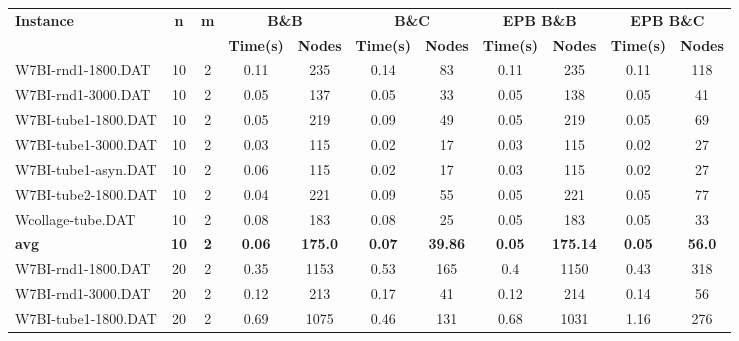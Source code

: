 \begin{table}[!ht]
\centering
\hspace*{-1cm}\begin{tabular}{lcccccccccc}
\toprule
\textbf{Instance} & \textbf{n} & \textbf{m} & \multicolumn{2}{c}{\textbf{B\&B}} & \multicolumn{2}{c}{\textbf{B\&C}}  & \multicolumn{2}{c}{\textbf{EPB B\&B}} & \multicolumn{2}{c}{\textbf{EPB B\&C}} \\

\cmidrule(r){4-5} \cmidrule(r){6-7} \cmidrule(r){8-9} \cmidrule(r){10-11} 
~ & ~ & ~ & \textbf{Time(s)} &\textbf{Nodes} & \textbf{Time(s)} &\textbf{Nodes} & \textbf{Time(s)} &\textbf{Nodes} & \textbf{Time(s)} &\textbf{Nodes}  \\
\midrule

W7BI-rnd1-1800.DAT & 10 & 2 &  \textcolor{blue2}{0.11} & 235 & 0.14 & 83 &  \textcolor{blue2}{0.11} & 235 &  \textcolor{blue2}{0.11} & 118 \\
W7BI-rnd1-3000.DAT & 10 & 2 &  \textcolor{blue2}{0.05} & 137 &  \textcolor{blue2}{0.05} & 33 &  \textcolor{blue2}{0.05} & 138 &  \textcolor{blue2}{0.05} & 41 \\
W7BI-tube1-1800.DAT & 10 & 2 &  \textcolor{blue2}{0.05} & 219 & 0.09 & 49 &  \textcolor{blue2}{0.05} & 219 &  \textcolor{blue2}{0.05} & 69 \\
W7BI-tube1-3000.DAT & 10 & 2 & 0.03 & 115 &  \textcolor{blue2}{0.02} & 17 & 0.03 & 115 &  \textcolor{blue2}{0.02} & 27 \\
W7BI-tube1-asyn.DAT & 10 & 2 & 0.06 & 115 &  \textcolor{blue2}{0.02} & 17 & 0.03 & 115 &  \textcolor{blue2}{0.02} & 27 \\
W7BI-tube2-1800.DAT & 10 & 2 &  \textcolor{blue2}{0.04} & 221 & 0.09 & 55 & 0.05 & 221 & 0.05 & 77 \\
Wcollage-tube.DAT & 10 & 2 & 0.08 & 183 & 0.08 & 25 &  \textcolor{blue2}{0.05} & 183 &  \textcolor{blue2}{0.05} & 33 \\
\cline{1-11} \textbf{avg} & \textbf{10} & \textbf{2} & \textbf{0.06} & \textbf{175.0} & \textbf{0.07} & \textbf{39.86} & \textbf{0.05} & \textbf{175.14} & \textbf{0.05} & \textbf{56.0} \\ \cline{1-11}
W7BI-rnd1-1800.DAT & 20 & 2 &  \textcolor{blue2}{0.35} & 1153 & 0.53 & 165 & 0.4 & 1150 & 0.43 & 318 \\
W7BI-rnd1-3000.DAT & 20 & 2 &  \textcolor{blue2}{0.12} & 213 & 0.17 & 41 &  \textcolor{blue2}{0.12} & 214 & 0.14 & 56 \\
W7BI-tube1-1800.DAT & 20 & 2 & 0.69 & 1075 &  \textcolor{blue2}{0.46} & 131 & 0.68 & 1031 & 1.16 & 276 \\

\end{tabular}
\end{table}
